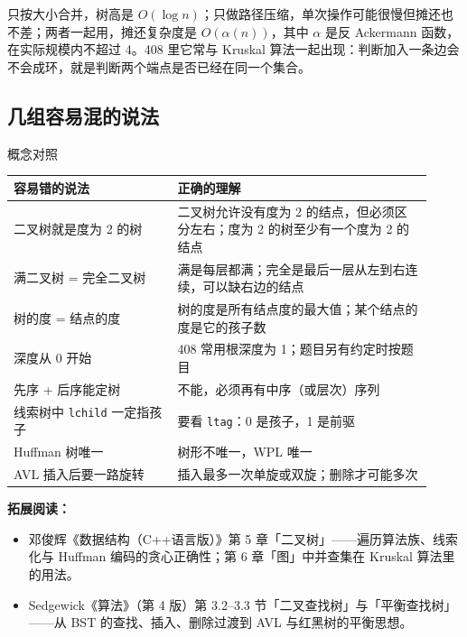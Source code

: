 只按大小合并，树高是 $O(\log n)$；只做路径压缩，单次操作可能很慢但摊还也不差；两者一起用，摊还复杂度是 $O(\alpha(n))$，其中 $\alpha$ 是反 Ackermann 函数，在实际规模内不超过 4。408 里它常与 Kruskal 算法一起出现：判断加入一条边会不会成环，就是判断两个端点是否已经在同一个集合。

\subsection{几组容易混的说法}

\begin{tablebox}{概念对照}
\centering
\begin{tabular}{p{0.36\linewidth}p{0.56\linewidth}}
\toprule
容易错的说法 & 正确的理解 \\
\midrule
二叉树就是度为 2 的树 & 二叉树允许没有度为 2 的结点，但必须区分左右；度为 2 的树至少有一个度为 2 的结点 \\
满二叉树 = 完全二叉树 & 满是每层都满；完全是最后一层从左到右连续，可以缺右边的结点 \\
树的度 = 结点的度 & 树的度是所有结点度的最大值；某个结点的度是它的孩子数 \\
深度从 0 开始 & 408 常用根深度为 1；题目另有约定时按题目 \\
先序 + 后序能定树 & 不能，必须再有中序（或层次）序列 \\
线索树中 \texttt{lchild} 一定指孩子 & 要看 \texttt{ltag}：0 是孩子，1 是前驱 \\
Huffman 树唯一 & 树形不唯一，WPL 唯一 \\
AVL 插入后要一路旋转 & 插入最多一次单旋或双旋；删除才可能多次 \\
\bottomrule
\end{tabular}
\end{tablebox}


\noindent\textbf{拓展阅读：}
\begin{itemize}
  \item 邓俊辉《数据结构（C++语言版）》第 5 章「二叉树」——遍历算法族、线索化与 Huffman 编码的贪心正确性；第 6 章「图」中并查集在 Kruskal 算法里的用法。
  \item Sedgewick《算法》（第 4 版）第 3.2--3.3 节「二叉查找树」与「平衡查找树」——从 BST 的查找、插入、删除过渡到 AVL 与红黑树的平衡思想。
\end{itemize}
